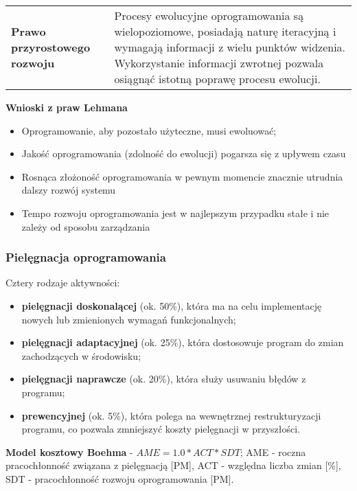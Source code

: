 \documentclass[../main.tex]{subfiles}
\begin{document}
\begin{table}[H]
\begin{center}
\begin{tabular}{p{.4\linewidth} p{.6\linewidth}}
                \textbf{Prawo przyrostowego rozwoju}
                &
                Procesy ewolucyjne
                oprogramowania są wielopoziomowe, posiadają naturę
                iteracyjną i wymagają informacji z wielu punktów
                widzenia. Wykorzystanie informacji zwrotnej pozwala
                osiągnąć istotną poprawę procesu ewolucji.
                \\
            \end{tabular}
        \end{center}
    \end{table}

    \textbf{Wnioski z praw Lehmana}
    \begin{itemize}
        \item Oprogramowanie, aby pozostało użyteczne, musi ewoluować;
        \item Jakość oprogramowania (zdolność do ewolucji) pogarsza się z upływem czasu
        \item Rosnąca złożoność oprogramowania w pewnym momencie znacznie utrudnia dalszy rozwój systemu
        \item Tempo rozwoju oprogramowania jest w najlepszym przypadku stałe i nie zależy od
        sposobu zarządzania
    \end{itemize}

    \subsubsection{Pielęgnacja oprogramowania}
    Cztery rodzaje aktywności:
    \begin{itemize}
        \item \textbf{pielęgnacji doskonalącej} (ok. 50\%), która ma na celu
        implementację nowych lub zmienionych wymagań
        funkcjonalnych;
        \item \textbf{pielęgnacji adaptacyjnej} (ok. 25\%), która dostosowuje
        program do zmian zachodzących w środowisku;
        \item \textbf{pielęgnacji naprawcze} (ok. 20\%), która służy usuwaniu
        błędów z programu;
        \item \textbf{prewencyjnej} (ok. 5\%), która polega na wewnętrznej
        restrukturyzacji programu, co pozwala zmniejszyć
        koszty pielęgnacji w przyszłości.
    \end{itemize}

    \textbf{Model kosztowy Boehma} - $AME = 1.0 * ACT * SDT$; AME - roczna pracochłonność związana
    z pielęgnacją [PM], ACT - względna liczba zmian [\%], SDT - pracochłonność rozwoju oprogramowania [PM].
\end{document}
